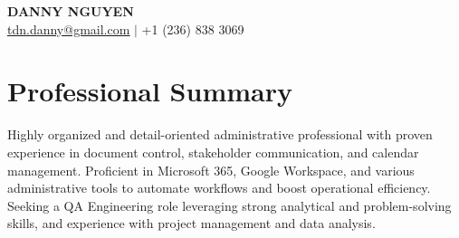 \documentclass[letterpaper,11pt]{article}
\begin{document}
\begin{center}
\textbf{\Huge \scshape DANNY NGUYEN} \\ \vspace{1pt}
\small \href{mailto:tdn.danny@gmail.com}{\underline{tdn.danny@gmail.com}} $|$ +1 (236) 838 3069
\end{center}

\section{Professional Summary}
Highly organized and detail-oriented administrative professional with proven experience in document control, stakeholder communication, and calendar management.  Proficient in Microsoft 365, Google Workspace, and various administrative tools to automate workflows and boost operational efficiency.  Seeking a QA Engineering role leveraging strong analytical and problem-solving skills, and experience with project management and data analysis.
\end{document}

